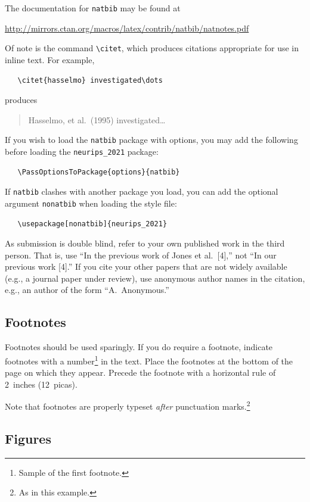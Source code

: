 \documentclass{article}
\begin{document}
The documentation for \verb+natbib+ may be found at
\begin{center}
  \url{http://mirrors.ctan.org/macros/latex/contrib/natbib/natnotes.pdf}
\end{center}
Of note is the command \verb+\citet+, which produces citations appropriate for
use in inline text.  For example,
\begin{verbatim}
   \citet{hasselmo} investigated\dots
\end{verbatim}
produces
\begin{quote}
  Hasselmo, et al.\ (1995) investigated\dots
\end{quote}

If you wish to load the \verb+natbib+ package with options, you may add the
following before loading the \verb+neurips_2021+ package:
\begin{verbatim}
   \PassOptionsToPackage{options}{natbib}
\end{verbatim}

If \verb+natbib+ clashes with another package you load, you can add the optional
argument \verb+nonatbib+ when loading the style file:
\begin{verbatim}
   \usepackage[nonatbib]{neurips_2021}
\end{verbatim}

As submission is double blind, refer to your own published work in the third
person. That is, use ``In the previous work of Jones et al.\ [4],'' not ``In our
previous work [4].'' If you cite your other papers that are not widely available
(e.g., a journal paper under review), use anonymous author names in the
citation, e.g., an author of the form ``A.\ Anonymous.''

\subsection{Footnotes}

Footnotes should be used sparingly.  If you do require a footnote, indicate
footnotes with a number\footnote{Sample of the first footnote.} in the
text. Place the footnotes at the bottom of the page on which they appear.
Precede the footnote with a horizontal rule of 2~inches (12~picas).

Note that footnotes are properly typeset \emph{after} punctuation
marks.\footnote{As in this example.}

\subsection{Figures}
\end{document}
